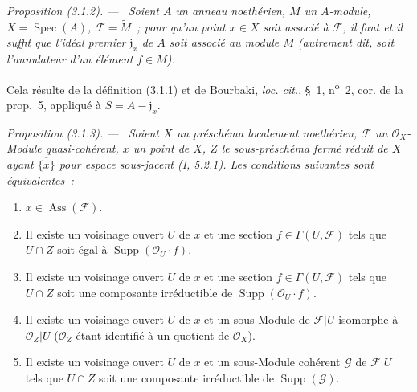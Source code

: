 \documentclass[10pt,oneside]{book}
\newcommand{\oldpage}[2][]{%
  \setcounter{footnote}{0}%
  \marginpar{\scriptsize\textbf{#1}~|~#2}\ignorespaces}
\newenvironment{proposition}[1][]{%
  \par\medskip\noindent\itshape Proposition (#1). ---\ }{\par}
\begin{document}
\begin{proposition}[3.1.2]
\label{IV.2.3.1.2-fr}
Soient $A$ un anneau noethérien, $M$ un $A$-module,
$X=\operatorname{Spec}(A)$, $\mathcal F=\widetilde M$~; pour qu'un point
$x\in X$ soit associé à $\mathcal F$, il faut et il suffit que l'idéal
premier $\mathfrak j_x$ de $A$ soit associé au module $M$ (autrement dit,
soit l'annulateur d'un élément $f\in M$).
\end{proposition}

Cela résulte de la définition (3.1.1) et de Bourbaki, \emph{loc. cit.},
\S~1, n\textsuperscript{o}~2, cor. de la prop.~5, appliqué à
$S=A-\mathfrak j_x$.

\begin{proposition}[3.1.3]
\label{IV.2.3.1.3-fr}
Soient $X$ un préschéma localement noethérien, $\mathcal F$ un
$\mathcal O_X$-Module quasi-cohérent, $x$ un point de $X$, $Z$ le
sous-préschéma fermé réduit de $X$ ayant $\overline{\{x\}}$ pour espace
sous-jacent (I, 5.2.1). Les conditions suivantes sont équivalentes~:
\begin{enumerate}
\item[\emph{a)}] $x\in\operatorname{Ass}(\mathcal F)$.

\oldpage[IV-2]{37}
\item[\emph{b)}] Il existe un voisinage ouvert $U$ de $x$ et une section
$f\in\Gamma(U,\mathcal F)$ tels que $U\cap Z$ soit égal à
$\operatorname{Supp}(\mathcal O_U\cdot f)$.
\item[\emph{b$'$)}] Il existe un voisinage ouvert $U$ de $x$ et une section
$f\in\Gamma(U,\mathcal F)$ tels que $U\cap Z$ soit une composante
irréductible de $\operatorname{Supp}(\mathcal O_U\cdot f)$.
\item[\emph{c)}] Il existe un voisinage ouvert $U$ de $x$ et un sous-Module
de $\mathcal F|U$ isomorphe à $\mathcal O_Z|U$ ($\mathcal O_Z$ étant
identifié à un quotient de $\mathcal O_X$).
\item[\emph{c$'$)}] Il existe un voisinage ouvert $U$ de $x$ et un
sous-Module cohérent $\mathcal G$ de $\mathcal F|U$ tels que $U\cap Z$ soit
une composante irréductible de $\operatorname{Supp}(\mathcal G)$.
\end{enumerate}
\end{proposition}
\end{document}
